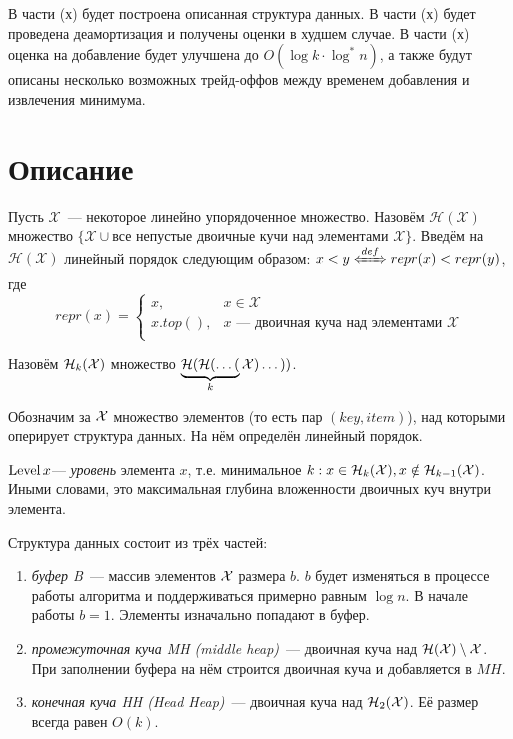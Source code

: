 В части (х) будет построена описанная структура данных.
В части (х) будет проведена деамортизация и получены оценки в худшем
случае.
В части (х) оценка на добавление будет улучшена до $O(\log k \cdot \log^*n)$,
а также будут описаны несколько возможных трейд-оффов между временем
добавления и извлечения минимума.

\section{Описание}

\begin{definition}
Пусть $\mathcal{X}$~--- некоторое линейно упорядоченное множество.
Назовём $\mathcal{H}(\mathcal{X})$
множество $\{\mathcal{X} \cup \text{все непустые двоичные кучи над элементами }\mathcal{X}\}$.
Введём на $\mathcal{H}(\mathcal{X})$ линейный порядок следующим образом:
$x < y \xLeftrightarrow{def} repr(x) < repr(y)$, где
$$
repr(x) = \left\lbrace
    \begin{array}{ll}
    x,& x \in \mathcal{X} \\
    x.top(),& x\text{~--- двоичная куча над элементами }\mathcal{X} \\
    \end{array}
\right.
$$
\end{definition}
\begin{designation}
Назовём $\mathcal{H}_k(\mathcal{X})$ множество $\underbrace{\mathcal{H}(\mathcal{H}(\dots(}_k\mathcal{X})\dots))$.
\end{designation}

Обозначим за $\mathcal{X}$ множество элементов (то есть пар $(key, item)$),
над которыми оперирует структура данных. На нём определён линейный порядок.

\begin{definition}
$\operatorname{Level} x $--- \emph{уровень} элемента $x$, т.е. минимальное $k: x \in \mathcal{H}_k(\mathcal{X}),
x \notin \mathcal{H}_{k-1}(\mathcal{X})$. Иными словами, это максимальная глубина вложенности
двоичных куч внутри элемента.
\end{definition}

Структура данных состоит из трёх частей:
\begin{enumerate}
\item \emph{буфер B}~--- массив элементов $\mathcal{X}$ размера $b$. $b$ будет
изменяться в процессе работы алгоритма и поддерживаться примерно равным $\log n$.
В начале работы $b=1$.
Элементы изначально попадают в буфер.
\item \emph{промежуточная куча MH (middle heap)}~--- двоичная куча над $\mathcal{H}(\mathcal{X})\setminus\mathcal{X}$.
При заполнении буфера на нём строится двоичная куча и добавляется в $MH$.
\item \emph{конечная куча HH  (Head Heap)}~--- двоичная куча над $\mathcal{H}_2(\mathcal{X})$.
Её размер всегда равен $O(k)$.
\end{enumerate}

